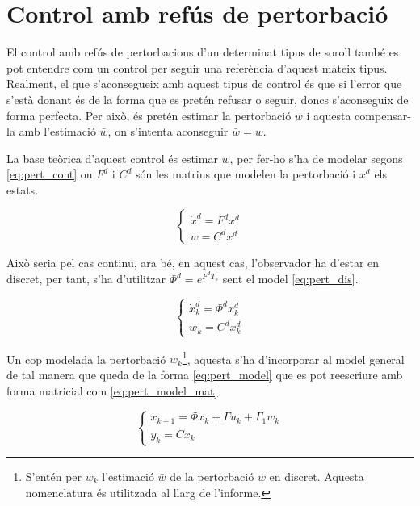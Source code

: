 \documentclass[12pt,a4paper,final,twoside,openright]{report}
\begin{document}
\section{Control amb refús de pertorbació}

El control amb refús de pertorbacions d'un determinat tipus de soroll també es pot entendre com un control per seguir una referència d'aquest mateix tipus. Realment, el que s'aconsegueix amb aquest tipus de control és que si l'error que s'està donant és de la forma que es pretén refusar o seguir, doncs s'aconseguix de forma perfecta. Per això, és pretén estimar la pertorbació $w$ i aquesta compensar-la amb l'estimació $\bar{w}$, on s'intenta aconseguir $\bar{w}=w$.

La base teòrica d'aquest control és estimar $w$, per fer-ho s'ha de modelar segons \eqref{eq:pert_cont} on $F^d$ i $C^d$ són les matrius que modelen la pertorbació i $x^d$ els estats. 

\begin{equation}\label{eq:pert_cont}
\left\{
\begin{array}{lr}
\dot{x}^d = F^d x^d\\
w=C^d x^d
\end{array}
\right.
\end{equation}

Això seria pel cas continu, ara bé, en aquest cas, l'observador ha d'estar en discret, per tant, s'ha d'utilitzar $\Phi^d=e^{F^d T_s}$ sent el model \eqref{eq:pert_dis}.

\begin{equation}\label{eq:pert_dis}
\left\{
\begin{array}{lr}
\dot{x}^d_k = \Phi^d x^d_k\\
w_k=C^d x^d_k
\end{array}
\right.
\end{equation}

Un cop modelada la pertorbació $w_k$\footnote{S'entén per $w_k$ l'estimació $\bar{w}$ de la pertorbació $w$ en discret. Aquesta nomenclatura és utilitzada al llarg de l'informe.}, aquesta s'ha d'incorporar al model general de tal manera que queda de la forma \eqref{eq:pert_model} que es pot reescriure amb forma matricial com \eqref{eq:pert_model_mat}

\vspace{-19pt}
\begin{equation}\label{eq:pert_model}
\left\{
\begin{array}{lr}
x_{k+1} = \Phi x_k + \Gamma u_k + \Gamma_1 w_k\\
y_k=C x_k
\end{array}
\right.
\end{equation}
\end{document}
